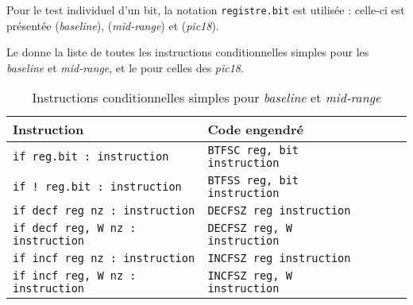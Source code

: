 Pour le test individuel d'un bit, la notation \texttt{registre.bit} est utilisée : celle-ci est présentée  (\emph{baseline}),  (\emph{mid-range}) et  (\emph{pic18}).

Le  donne la liste de toutes les instructions conditionnelles simples pour les \emph{baseline} et \emph{mid-range}, et le  pour celles des \emph{pic18}.

\begin{table}[!ht]
  \centering
  \small
  \begin{tabular}{lp{4cm}lll}
    \textbf{Instruction} & \textbf{Code engendré}\\
    \hline
    \texttt{if reg.bit : instruction} & \texttt{BTFSC reg, bit instruction} \\
    \texttt{if ! reg.bit : instruction} & \texttt{BTFSS reg, bit instruction} \\
    \texttt{if decf reg nz : instruction} & \texttt{DECFSZ reg instruction} \\
    \texttt{if decf reg, W nz : instruction} & \texttt{DECFSZ reg, W instruction} \\
    \texttt{if incf reg nz : instruction} & \texttt{INCFSZ reg instruction} \\
    \texttt{if incf reg, W nz : instruction} & \texttt{INCFSZ reg, W instruction} \\
    \hline
  \end{tabular}
  \caption{Instructions conditionnelles simples pour \emph{baseline} et \emph{mid-range}}
\end{table}

